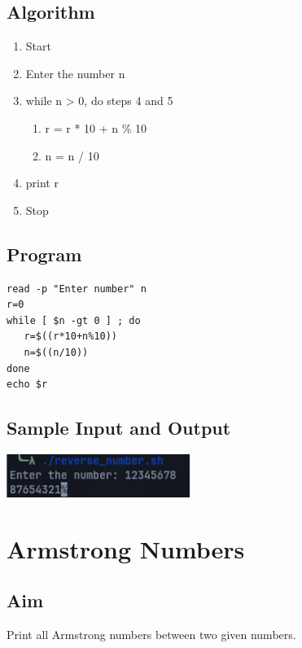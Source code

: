 \subsection{Algorithm}
\begin{enumerate}
   \item Start
   \item Enter the number n
   \item while n > 0, do steps 4 and 5
       \begin{enumerate}
           \item r = r * 10 + n \% 10
           \item n = n / 10
       \end{enumerate}
   \item print r
   \item Stop
\end{enumerate}

\subsection{Program}
\begin{lstlisting}[label={list:program:reverse_number}]
read -p "Enter number" n
r=0
while [ $n -gt 0 ] ; do
   r=$((r*10+n%10))
   n=$((n/10))
done
echo $r
\end{lstlisting}

\subsection{Sample Input and Output}
\includegraphics[]{Cycle_1//Outputs/revess.png}


\section{Armstrong Numbers}

\subsection{Aim}
Print all Armstrong numbers between two given numbers.


